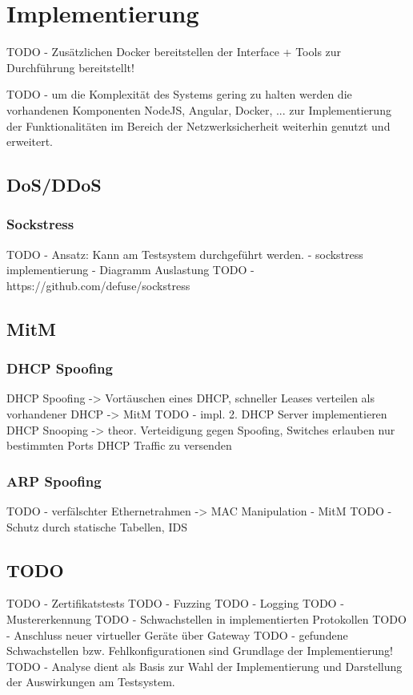 \chapter{Implementierung}

TODO - Zusätzlichen Docker bereitstellen der Interface + Tools zur Durchführung bereitstellt!

TODO - um die Komplexität des Systems gering zu halten werden die vorhandenen Komponenten NodeJS, Angular, Docker, ... zur Implementierung der Funktionalitäten im Bereich der Netzwerksicherheit weiterhin genutzt und erweitert.

\section{\ac{DoS}/\ac{DDoS}}
\subsection{Sockstress}
\label{Impl:Sockstress}
TODO - Ansatz: Kann am Testsystem durchgeführt werden. - sockstress implementierung - Diagramm Auslastung
TODO - https://github.com/defuse/sockstress

\section{\ac{MitM}}
\subsection{DHCP Spoofing}
\label{Impl:DHCP Spoofing}
DHCP Spoofing -> Vortäuschen eines DHCP, schneller Leases verteilen als vorhandener DHCP -> MitM
TODO - impl. 2. DHCP Server implementieren
DHCP Snooping -> theor. Verteidigung gegen Spoofing, Switches erlauben nur bestimmten Ports DHCP Traffic zu versenden

\subsection{\ac{ARP} Spoofing}
TODO - verfälschter Ethernetrahmen -> MAC Manipulation - MitM
TODO - Schutz durch statische Tabellen, \ac{IDS}

\section{TODO}

TODO - Zertifikatstests
TODO - Fuzzing
TODO - Logging
TODO - Mustererkennung
TODO - Schwachstellen in implementierten Protokollen
TODO - Anschluss neuer virtueller Geräte über Gateway
TODO - gefundene Schwachstellen bzw. Fehlkonfigurationen sind Grundlage der Implementierung!
TODO - Analyse dient als Basis zur Wahl der Implementierung und Darstellung der Auswirkungen am Testsystem.